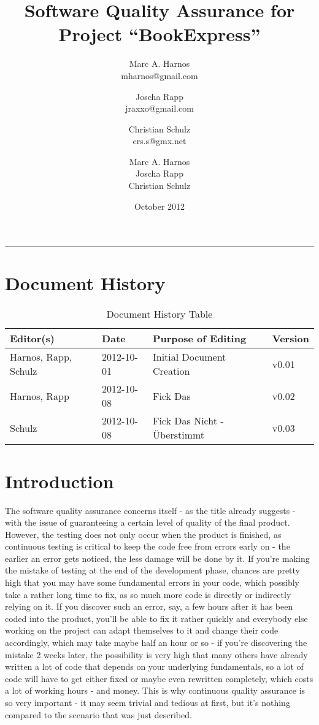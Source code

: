 \documentclass[11pt,a4paper,oneside,svgnames]{report}
\title{Software Quality Assurance for Project ``BookExpress''}
\author{Marc A. Harnos\\ {mharnos@gmail.com} \and Joscha Rapp\\ {jraxxo@gmail.com} \and Christian Schulz\\ {crs.s@gmx.net}}
\author{Marc A. Harnos\\ Joscha Rapp\\ Christian Schulz}
\date{October 2012}
\makeatletter
\renewcommand{\maketitle}{\begin{titlepage}%
    \let\footnotesize\small
    \let\footnoterule\relax
    \parindent \z@
    \reset@font
    \null\vfil
    \begin{flushleft}
      \huge \@title
    \end{flushleft}
    \par
    \hrule height 4pt
    \par
    \begin{flushright}
      \LARGE \@author \par
    \end{flushright}
    \vskip 60\p@
    \vfil\null
  \end{titlepage}%
  \setcounter{footnote}{0}%
}
\makeatother
\begin{document}
\maketitle
\tableofcontents

\chapter*{Document History}

\begin{table}[H]
\centering
\begin{tabular}{|l|l|l|l|}
\hline 
Editor(s) & Date & Purpose of Editing & Version \\ 
\hline 
Harnos, Rapp, Schulz & 2012-10-01 & Initial Document Creation & v0.01 \\ 
\hline
Harnos, Rapp & 2012-10-08 & Fick Das & v0.02 \\ 
\hline
Schulz & 2012-10-08 & Fick Das Nicht - Überstimmt & v0.03 \\ 
\hline
\end{tabular} 
\caption{Document History Table}
\label{tab:document-history}
\end{table}

\chapter{Introduction}
The software quality assurance concerns itself - as the title already suggests - with the issue of guaranteeing a certain level of quality of the final product. However, the testing does not only occur when the product is finished, as continuous testing is critical to keep the code free from errors early on - the earlier an error gets noticed, the less damage will be done by it. If you're making the mistake of testing at the end of the development phase, chances are pretty high that you may have some fundamental errors in your code, which possibly take a rather long time to fix, as so much more code is directly or indirectly relying on it. If you discover such an error, say, a few hours after it has been coded into the product, you'll be able to fix it rather quickly and everybody else working on the project can adapt themselves to it and change their code accordingly, which may take maybe half an hour or so - if you're discovering the mistake 2 weeks later, the possibility is very high that many others have already written a lot of code that depends on your underlying fundamentals, so a lot of code will have to get either fixed or maybe even rewritten completely, which costs a lot of working hours - and money. This is why continuous quality assurance is so very important - it may seem trivial and tedious at first, but it's nothing compared to the scenario that was just described.
\end{document}
